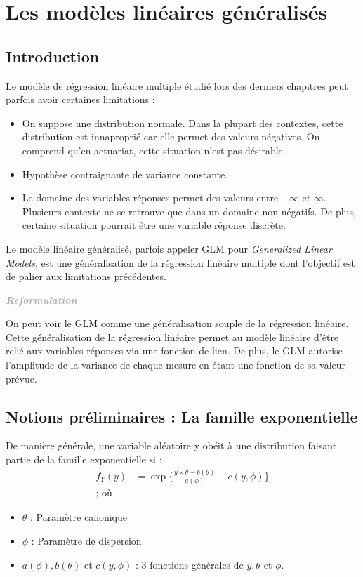 \documentclass[11pt,french]{report}
\newenvironment{moreInfo}[1]
	{\begin{mdframed}
	\textcolor{darkgray}{\huge \raisebox{-3.5pt}{\faInfo} 
	\hspace{0.5cm} \large\bfseries #1}\\[5pt]
	\normalsize
	\makebox[0.1\textwidth][l]{}	
	\begin{minipage}{10cm}}
	{	\end{minipage}
	\end{mdframed}}
\begin{document}
\chapter{Les modèles linéaires généralisés}
\section{Introduction}
Le modèle de régression linéaire multiple étudié lors des derniers chapitres peut parfois avoir certaines limitations : 
\begin{itemize}
\item On suppose une distribution normale. Dans la plupart des contextes, cette distribution est innaproprié car elle permet des valeurs négatives. On comprend qu'en actuariat, cette situation n'est pas désirable.
\item Hypothèse contraignante de variance constante.
\item Le domaine des variables réponses permet des valeurs entre $-\infty$ et $\infty$. Plusieurs contexte ne se retrouve que dans un domaine non négatifs. De plus, certaine situation pourrait être une variable réponse discrète.
\end{itemize}

Le modèle linéaire généralisé, parfois appeler GLM pour \emph{Generalized Linear Models}, est une généralisation de la régression linéaire multiple dont l'objectif est de palier aux limitations précédentes.

\begin{moreInfo}{\emph{Reformulation}}
     On peut voir le GLM comme une généralisation souple de la régression linéaire. Cette généralisation de la régression linéaire permet au modèle linéaire d'être relié aux variables réponses via une fonction de lien. De plus, le GLM autorise l'amplitude de la variance de chaque mesure en étant une fonction de sa valeur prévue.
\end{moreInfo}

\section{Notions préliminaires : La famille exponentielle}
De manière générale, une variable aléatoire y obéit à une distribution faisant partie de la famille exponentielle si :
\begin{align*}
f_Y(y) &= \exp\bigg\lbrace \frac{y \times \theta - b(\theta)}{a(\phi)} - c(y, \phi) \bigg\rbrace \\
\text{; où } 
\end{align*}
\begin{itemize}
     \item $\theta$ : Paramètre canonique
     \item $\phi $ : Paramètre de dispersion
     \item $a(\phi), b(\theta)$ et $c(y, \phi)$ : 3 fonctions générales de $y, \theta$ et $\phi$.
\end{itemize}
\end{document}
